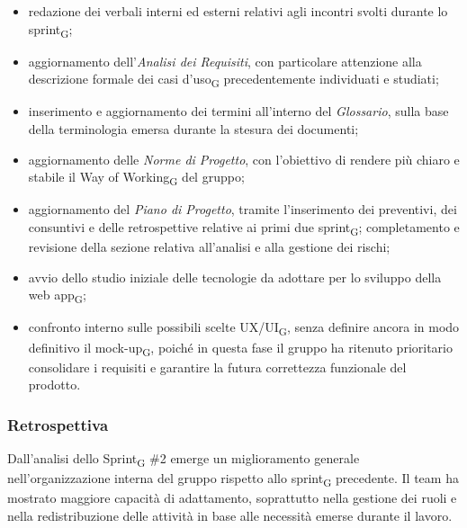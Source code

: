 \documentclass[a4paper, 10pt, colorlinks=true, linkcolor=black, urlcolor=blue, citecolor=blue, hidelinks]{article}
\begin{document}
\begin{itemize}
    \item redazione dei verbali interni ed esterni relativi agli incontri svolti durante lo sprint\textsubscript{G};

    \item aggiornamento dell'\textit{Analisi dei Requisiti}, con particolare attenzione alla descrizione formale dei casi d'uso\textsubscript{G} precedentemente individuati e studiati;

    \item inserimento e aggiornamento dei termini all'interno del \textit{Glossario}, sulla base della terminologia emersa durante la stesura dei documenti;

    \item aggiornamento delle \textit{Norme di Progetto}, con l'obiettivo di rendere più chiaro e stabile il Way of Working\textsubscript{G} del gruppo;

    \item aggiornamento del \textit{Piano di Progetto}, tramite l'inserimento dei preventivi, dei consuntivi e delle retrospettive relative ai primi due sprint\textsubscript{G}; completamento e revisione della sezione relativa all'analisi e alla gestione dei rischi;

    \item avvio dello studio iniziale delle tecnologie da adottare per lo sviluppo della web app\textsubscript{G};

    \item confronto interno sulle possibili scelte UX/UI\textsubscript{G}, senza definire ancora in modo definitivo il mock-up\textsubscript{G}, poiché in questa fase il gruppo ha ritenuto prioritario consolidare i requisiti e garantire la futura correttezza funzionale del prodotto.
\end{itemize}

\subsubsection{Retrospettiva}
Dall'analisi dello Sprint\textsubscript{G} \#2 emerge un miglioramento generale nell'organizzazione interna del gruppo rispetto allo sprint\textsubscript{G} precedente. Il team ha mostrato maggiore capacità di adattamento, soprattutto nella gestione dei ruoli e nella redistribuzione delle attività in base alle necessità emerse durante il lavoro.
\end{document}
